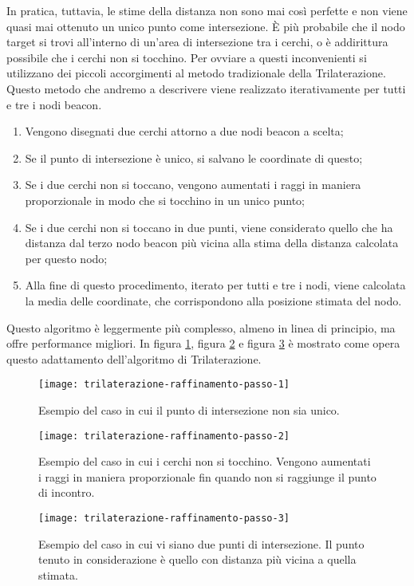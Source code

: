 In pratica, tuttavia, le stime della distanza non sono mai così perfette e non viene quasi mai ottenuto un unico punto come intersezione. È più probabile che il nodo target si trovi all'interno di un’area di intersezione tra i cerchi, o è addirittura possibile che i cerchi non si tocchino. Per ovviare a questi inconvenienti si utilizzano dei piccoli accorgimenti al metodo tradizionale della Trilaterazione. Questo metodo che andremo a descrivere viene realizzato iterativamente per tutti e tre i nodi beacon.
\begin{enumerate}
	
	\item Vengono disegnati due cerchi attorno a due nodi beacon a scelta;
	
	\item Se il punto di intersezione è unico, si salvano le coordinate di questo;
	
	\item Se i due cerchi non si toccano, vengono aumentati i raggi in maniera proporzionale in modo che si tocchino in un unico punto;
	
	\item Se i due cerchi non si toccano in due punti, viene considerato quello che ha distanza dal terzo nodo beacon più vicina alla stima della distanza calcolata per questo nodo;
	
	\item Alla fine di questo procedimento, iterato per tutti e tre i nodi, viene calcolata la media delle coordinate, che corrispondono alla posizione stimata del nodo.
	
\end{enumerate}
Questo algoritmo è leggermente più complesso, almeno in linea di principio, ma offre performance migliori. In figura \ref{fig:trilaterazione-raffinamento-passo-1}, figura \ref{fig:trilaterazione-raffinamento-passo-2} e figura \ref{fig:trilaterazione-raffinamento-passo-3} è mostrato come opera questo adattamento dell’algoritmo di Trilaterazione.

\begin{figure}[htp]
	\centering
	\texttt{[image: trilaterazione-raffinamento-passo-1]}
	\caption{Esempio del caso in cui il punto di intersezione non sia unico.}
	\label{fig:trilaterazione-raffinamento-passo-1}
\end{figure}

\begin{figure}[htp]
	\centering
	\texttt{[image: trilaterazione-raffinamento-passo-2]}
	\caption{Esempio del caso in cui i cerchi non si tocchino. Vengono aumentati i raggi in maniera proporzionale fin quando non si raggiunge il punto di incontro.}
	\label{fig:trilaterazione-raffinamento-passo-2}
\end{figure}

\begin{figure}[htp]
	\centering
	\texttt{[image: trilaterazione-raffinamento-passo-3]}
	\caption{Esempio del caso in cui vi siano due punti di intersezione. Il punto tenuto in considerazione è quello con distanza più vicina a quella stimata.}
	\label{fig:trilaterazione-raffinamento-passo-3}
\end{figure}